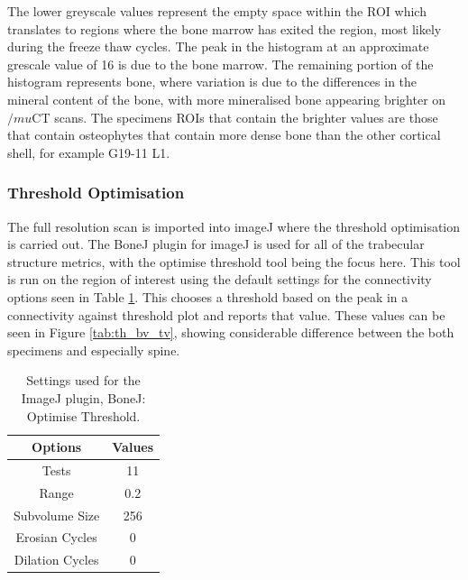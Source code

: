 The lower greyscale values represent the empty space within the ROI which
translates to regions where the bone marrow has exited the region, most likely
during the freeze thaw cycles.
The peak in the histogram at an approximate grescale value of 16 is due to the
bone marrow.
The remaining portion of the histogram represents bone, where variation is due
to the differences in the mineral content of the bone, with more mineralised
bone appearing brighter on $/mu$CT scans.
The specimens ROIs that contain the brighter values are those that contain
osteophytes that contain more dense bone than the other cortical shell, for
example G19-11 L1.

\subsubsection{Threshold Optimisation}


The full resolution scan is imported into imageJ where the threshold
optimisation is carried out.
The BoneJ plugin for imageJ is used for all of the trabecular structure metrics,
with the optimise threshold tool being the focus here.
This tool is run on the region of interest using the default settings for the
connectivity options seen in Table \ref{tab:bonej}.
This chooses a threshold based on the peak in a connectivity against threshold
plot and reports that value.
These values can be seen in Figure \ref{tab:th_bv_tv}, showing considerable
difference between the both specimens and especially spine.

\begin{table}[ht!]
	\caption{Settings used for the ImageJ plugin, BoneJ: Optimise Threshold.}
	\label{tab:bonej}
	\centering
	\begin{tabular}{c|c}
	Options & Values \\
	\hline
	\hline
	Tests & 11  \\
	Range & 0.2 \\
	Subvolume Size & 256 \\
	Erosian Cycles & 0 \\
	Dilation Cycles & 0 \\
	\hline
	\end{tabular}
\end{table}

